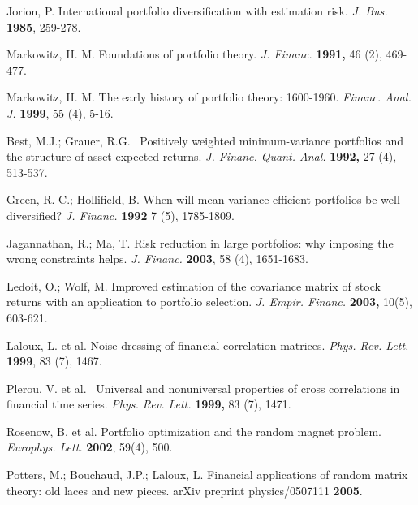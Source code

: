 \documentclass[journal,article,submit,moreauthors,pdftex]{Definitions/mdpi}
\begin{document}
%




\begin{thebibliography}{99}
	 Jorion, P. International portfolio diversification with
	estimation risk. \textit{J. Bus.} \textbf{1985}, 259-278.
	
	 Markowitz, H. M. Foundations of portfolio theory. \textit{J.
		Financ. }\textbf{1991, }46 (2), 469-477.
	
	 Markowitz, H. M. The early history of portfolio theory:
	1600-1960. \textit{Financ. Anal. J. }\textbf{1999}, 55 (4), 5-16.
	
	 Best, M.J.; Grauer, R.G. \ Positively weighted
	minimum-variance portfolios and the structure of asset expected returns. 
	\textit{J. Financ. Quant. Anal.}  \textbf{1992, }27 (4), 513-537.
	
	 Green, R. C.; Hollifield, B. When will mean-variance
	efficient portfolios be well diversified? \textit{J. Financ. }\textbf{1992 }%
	7 (5), 1785-1809.
	
	 Jagannathan, R.; Ma, T. Risk reduction in large
	portfolios: why imposing the wrong constraints helps. \textit{J. Financ. }%
	\textbf{2003}, 58 (4), 1651-1683.
	
	 Ledoit, O.; Wolf, M.  Improved estimation of the covariance
	matrix of stock returns with an application to portfolio selection. \textit{%
		J. Empir. Financ. }\textbf{2003, }10(5), 603-621.
	
	 Laloux, L. et al. Noise dressing of financial correlation
	matrices. \textit{Phys. Rev. Lett. }\textbf{1999}, 83 (7), 1467.
	
	 Plerou, V. et al. \ Universal and nonuniversal properties
	of cross correlations in financial time series. \textit{Phys. Rev. Lett. }%
	\textbf{1999, }83 (7), 1471.
	
	 Rosenow, B. et al. Portfolio optimization and the random
	magnet problem. \textit{Europhys. Lett. }\textbf{2002}, 59(4), 500.
	
	 Potters, M.; Bouchaud, J.P.; Laloux, L.  Financial
	applications of random matrix theory: old laces and new pieces. arXiv
	preprint physics/0507111 \textbf{2005}.
	

\end{thebibliography}
\end{document}
